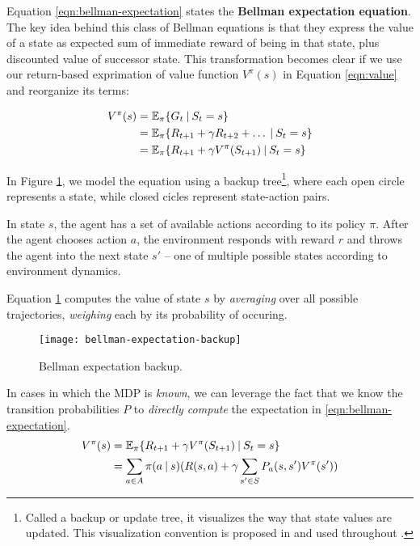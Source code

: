 Equation \ref{eqn:bellman-expectation} states the \textbf{Bellman expectation equation}.
The key idea behind this class of Bellman equations is that they express the value of a state as expected sum of immediate reward of being in that state,  plus discounted value of successor state.
This transformation becomes clear if we use our return-based exprimation of value function $V^{\pi}(s)$ in Equation \ref{eqn:value} and reorganize its terms:

\begin{equation} \label{eqn:bellman-expectation}
\begin{aligned}
    V^{\pi}(s)
        &= \mathbb{E}_{\pi}\{ G_t \:\vert\: S_t = s \} \\
        &= \mathbb{E}_{\pi}\{ R_{t+1} + \gamma R_{t+2} + \dots \:\vert\: S_t = s \} \\
        &= \mathbb{E}_{\pi}\{ R_{t+1} + \gamma V^{\pi}(S_{t+1}) \:\vert\: S_{t} = s \} \\
\end{aligned}
\end{equation}

In Figure \ref{fig:expectation-backup}, we model the equation using a backup tree\footnote{Called a backup or update tree, it visualizes the way that state values are updated. This visualization convention is proposed in and used throughout \cite{rlai}.}, where each open circle represents a state, while closed cicles represent state-action pairs.

In state $s$, the agent has a set of available actions according to its policy $\pi$.
After the agent chooses action $a$, the environment responds with reward $r$ and throws the agent into the next state  $s'$ -- one of multiple possible states according to environment dynamics.

Equation \ref{fig:expectation-backup} computes the value of state $s$ by \emph{averaging} over all possible trajectories, \emph{weighing} each by its probability of occuring.

\begin{figure}[ht]
    \centering
    \caption{Bellman expectation backup.} \label{fig:expectation-backup}
    \vspace*{0.2cm}
    \texttt{[image: bellman-expectation-backup]}
\end{figure}

In cases in which the MDP is \emph{known}, we can leverage the fact that we know the transition probabilities $P$ to \emph{directly compute} the expectation in \ref{eqn:bellman-expectation}.
\begin{equation}
    \begin{aligned}
        V^{\pi}(s)
            &= \mathbb{E}_{\pi}\{ R_{t+1} + \gamma V^{\pi}(S_{t+1}) \:\vert\: S_{t} = s \} \\
            &= \sum_{a \in A}{
                \pi(a \:\vert\: s) ( R(s, a) + \gamma \sum_{s' \in S}{
                    P_a(s, s') V^{\pi}(s')
                })
            }
    \end{aligned}
\end{equation}

